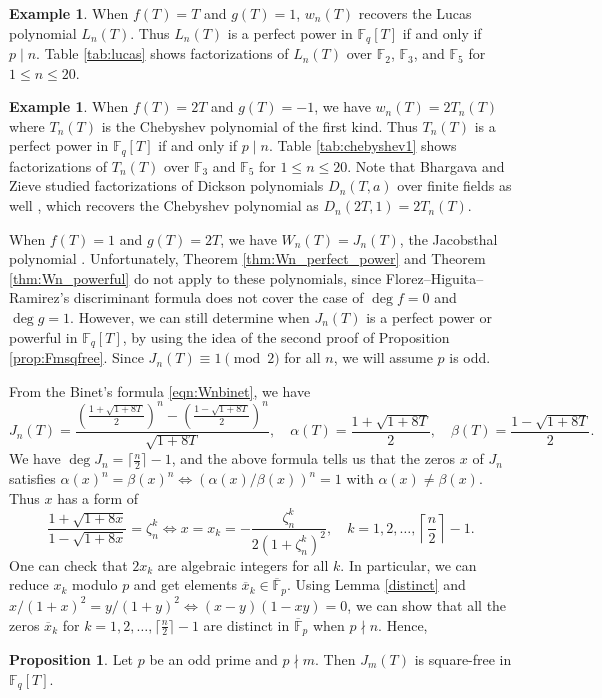 \documentclass[letterpaper, 10pt]{article}
\newcommand{\bF}{\mathbb{F}}
\newcommand{\1}{\mathds{1}}	%
\theoremstyle{definition}
\newtheorem{proposition}[theorem]{Proposition}
\newtheorem{example}[theorem]{Example}
\theoremstyle{remark}
\begin{document}
\begin{example}
    When $f(T) = T$ and $g(T) = 1$, $w_n(T)$ recovers the Lucas polynomial $L_n(T)$.
    Thus $L_n(T)$ is a perfect power in $\bF_q[T]$ if and only if $p \mid n$.
    Table \ref{tab:lucas} shows factorizations of $L_n(T)$ over $\bF_2$, $\bF_3$, and $\bF_5$ for $1 \le n \le 20$.
\end{example}

\begin{example}
    When $f(T) = 2T$ and $g(T) = -1$, we have $w_n(T) = 2 T_n(T)$ where $T_n(T)$ is the Chebyshev polynomial of the first kind.
    Thus $T_n(T)$ is a perfect power in $\bF_q[T]$ if and only if $p \mid n$.
    Table \ref{tab:chebyshev1} shows factorizations of $T_n(T)$ over $\bF_3$ and $\bF_5$ for $1 \le n \le 20$.
    Note that Bhargava and Zieve studied factorizations of Dickson polynomials $D_n(T, a)$ over finite fields as well \cite{bhargava1999factoring}, which recovers the Chebyshev polynomial as $D_n(2T, 1) = 2 T_n(T)$.
\end{example}


When $f(T) = 1$ and $g(T) = 2T$, we have $W_n(T) = J_n(T)$, the Jacobsthal polynomial \cite{horadam1997jacobsthal}.
Unfortunately, Theorem \ref{thm:Wn_perfect_power} and Theorem \ref{thm:Wn_powerful} do not apply to these polynomials, since Florez--Higuita--Ramirez's discriminant formula \cite[Theorem 4]{florez2019resultant} does not cover the case of $\deg f = 0$ and $\deg g = 1$.
However, we can still determine when $J_n(T)$ is a perfect power or powerful in $\bF_q[T]$, by using the idea of the second proof of Proposition \ref{prop:Fmsqfree}.
Since $J_n(T) \equiv 1 \pmod{2}$ for all $n$, we will assume $p$ is odd.

From the Binet's formula \eqref{eqn:Wnbinet}, we have
\[
J_n(T) = \frac{\left(\frac{1 + \sqrt{1 + 8T}}{2}\right)^n - \left(\frac{1 - \sqrt{1 + 8T}}{2}\right)^n}{\sqrt{1 + 8T}}, \quad \alpha(T) = \frac{1 + \sqrt{1 + 8T}}{2}, \quad \beta(T) = \frac{1 - \sqrt{1 + 8T}}{2}.
\]
We have $\deg J_n = \lceil \frac{n}{2} \rceil - 1$, and the above formula tells us that the zeros $x$ of $J_n$ satisfies $\alpha(x)^n = \beta(x)^n \Leftrightarrow (\alpha(x) / \beta(x))^n = 1$ with $\alpha(x) \ne \beta(x)$.
Thus $x$ has a form of
\[
\frac{1 + \sqrt{1 + 8x}}{1 - \sqrt{1 + 8x}} = \zeta_n^k \Leftrightarrow x = x_k = - \frac{\zeta_n^k}{2(1 + \zeta_n^k)^2},\quad k = 1, 2, \dots, \left \lceil \frac{n}{2} \right \rceil - 1.
\]
One can check that $2x_k$ are algebraic integers for all $k$.
In particular, we can reduce $x_k$ modulo $p$ and get elements $\overline{x}_k \in \overline{\bF}_p$.
Using Lemma \ref{distinct} and $x / (1 + x)^2 = y / (1 + y)^2 \Leftrightarrow (x - y)(1 - xy) = 0$, we can show that all the zeros $\overline{x}_k$ for $k = 1, 2, \dots, \lceil \frac{n}{2} \rceil - 1$ are distinct in $\overline{\bF}_p$ when $p \nmid n$. Hence,
\begin{proposition}
    \label{thm:Jmsqfree}
    Let $p$ be an odd prime and $p \nmid m$. Then $J_m(T)$ is square-free in $\bF_q[T]$.
\end{proposition}
\end{document}
